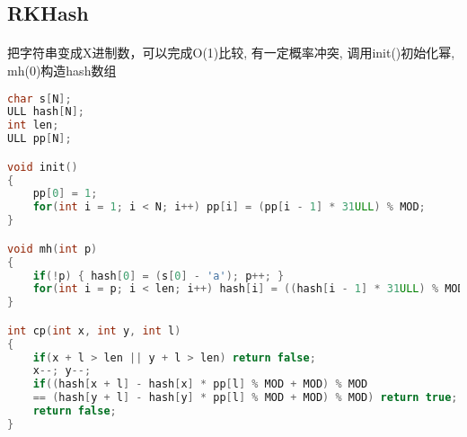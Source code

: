 ﻿\subsection{RKHash}
\paragraph{}
把字符串变成X进制数，可以完成O(1)比较, 有一定概率冲突, 调用init()初始化幂, mh(0)构造hash数组
\begin{lstlisting}[language=C++]
char s[N];
ULL hash[N];
int len;
ULL pp[N];

void init()
{
    pp[0] = 1;
    for(int i = 1; i < N; i++) pp[i] = (pp[i - 1] * 31ULL) % MOD;
}

void mh(int p)
{
    if(!p) { hash[0] = (s[0] - 'a'); p++; }
    for(int i = p; i < len; i++) hash[i] = ((hash[i - 1] * 31ULL) % MOD + (s[i] - 'a')) % MOD;
}

int cp(int x, int y, int l)
{
    if(x + l > len || y + l > len) return false;
    x--; y--;
    if((hash[x + l] - hash[x] * pp[l] % MOD + MOD) % MOD 
	== (hash[y + l] - hash[y] * pp[l] % MOD + MOD) % MOD) return true;
    return false;
}
\end{lstlisting}